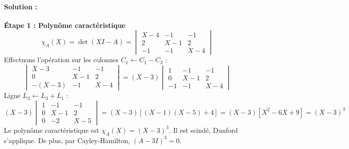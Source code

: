 \documentclass[11pt,a4paper]{article}
\begin{document}
\paragraph*{Solution :}

\textbf{Étape 1 : Polynôme caractéristique}
$$ \chi_A(X) = \det(XI - A) = \begin{vmatrix} X-4 & -1 & -1 \\ 2 & X-1 & 2 \\ -1 & -1 & X-4 \end{vmatrix} $$
Effectuons l'opération sur les colonnes $C_1 \leftarrow C_1 - C_3$ :
$$ \begin{vmatrix} X-3 & -1 & -1 \\ 0 & X-1 & 2 \\ -(X-3) & -1 & X-4 \end{vmatrix} = (X-3) \begin{vmatrix} 1 & -1 & -1 \\ 0 & X-1 & 2 \\ -1 & -1 & X-4 \end{vmatrix} $$
Ligne $L_3 \leftarrow L_3 + L_1$ :
$$ (X-3) \begin{vmatrix} 1 & -1 & -1 \\ 0 & X-1 & 2 \\ 0 & -2 & X-5 \end{vmatrix} = (X-3) [ (X-1)(X-5) + 4 ] = (X-3)[X^2 - 6X + 9] = (X-3)^3 $$
Le polynôme caractéristique est $\chi_A(X) = (X-3)^3$. Il est scindé, Dunford s'applique.
De plus, par Cayley-Hamilton, $(A-3I)^3 = 0$.
\end{document}
